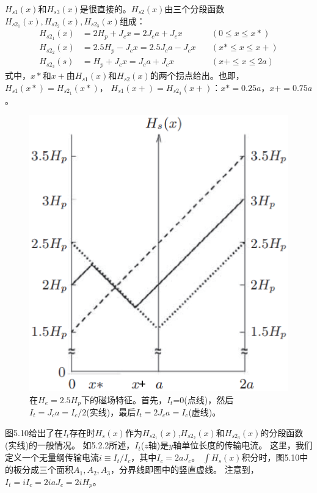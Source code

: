 $H_{s1}(x)$和$H_{s3}(x)$是很直接的。$H_{s2}(x)$由三个分段函数$H_{s2_1}(x),H_{s2_2}(x),H_{s2_3}(x)$组成：
\begin{align*}%
H_{s2_{1}}(x)&=2H_{p}+J_{c}x=2J_{c}a+J_{c}x\qquad&(0\leq x\leq x*)\\
H_{s2_{2}}(x)&=2.5H_{p}-J_{c}x=2.5J_{c}a-J_{c}x\quad&(x*\leq x\leq x+)\\
H_{s2_{3}}(s)&=H_{p}+J_{c}x=J_{c}a+J_{c}x\qquad&(x+\leq x\leq 2a)
\end{align*}
式中，$x*$和$x+$由$H_{s1}(x)$和$H_{s2}(x)$的两个拐点给出。也即，$H_{s1}(x*)=H_{s2_1}(x*)$，
$H_{s1}(x+)=H_{s2_3}(x+)$：$x*=0.25a$，$x+=0.75a$。
\begin{figure}[htbp]
	\centering
	\includegraphics[scale=0.6]{chpt5/figs/fig5.9.eps}
	\caption{在$H_e=2.5H_p$下的磁场特征。首先，$I_t$=0(点线)，然后$I_t=J_c a=I_c/2$(实线)，最后$I_t=2J_c a=I_c$(虚线)。}
\end{figure}

图5.10给出了在$I_t$存在时$H_s(x)$作为$H_{s2_1}(x)$,$H_{s2_2}(x)$和$H_{s2_3}(x)$的分段函数(实线)的一般情况。
如5.2.2所述，$I_t$($z$轴)是$y$轴单位长度的传输电流。
这里，我们定义一个无量纲传输电流$i\equiv I_t/I_c$，其中$I_c=2aJ_c$。
$\int H_s(x)$积分时，图5.10中的板分成三个面积$A_1,A_2,A_3$，分界线即图中的竖直虚线。
注意到，$I_t=i I_c=2iaJ_c=2iH_p$。

